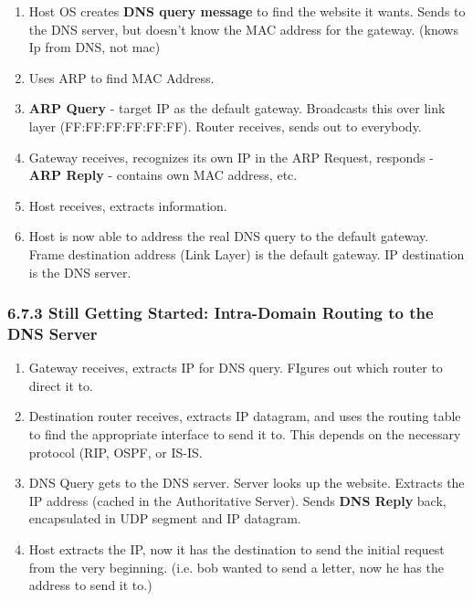 \documentclass[11pt]{article}
\begin{document}
\begin{enumerate}
\item Host OS creates \textbf{DNS query message} to find the website it wants. Sends to the DNS server, but doesn't know the MAC address for the gateway. (knows Ip from DNS, not mac)
\item Uses ARP to find MAC Address.
\item \textbf{ARP Query} - target IP as the default gateway. Broadcasts this over link layer (FF:FF:FF:FF:FF:FF). Router receives, sends out to everybody.
\item Gateway receives, recognizes its own IP in the ARP Request, responds - \textbf{ARP Reply} - contains own MAC address, etc.
\item Host receives, extracts information.
\item Host is now able to address the real DNS query to the default gateway. Frame destination address (Link Layer) is the default gateway. IP destination is the DNS server.
\end{enumerate}

\subsubsection{6.7.3 Still Getting Started: Intra-Domain Routing to the DNS Server}
\label{sec:orgf744714}

\begin{enumerate}
\item Gateway receives, extracts IP for DNS query. FIgures out which router to direct it to.
\item Destination router receives, extracts IP datagram, and uses the routing table to find the appropriate interface to send it to. This depends on the necessary protocol (RIP, OSPF, or IS-IS.
\item DNS Query gets to the DNS server. Server looks up the website. Extracts the IP address (cached in the Authoritative Server). Sends \textbf{DNS Reply} back, encapsulated in UDP segment and IP datagram.
\item Host extracts the IP, now it has the destination to send the initial request from the very beginning. (i.e. bob wanted to send a letter, now he has the address to send it to.)
\end{enumerate}
\end{document}
